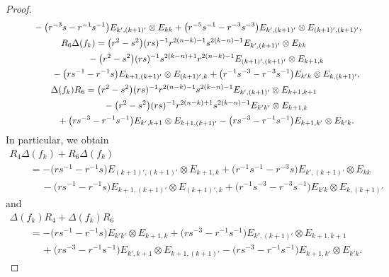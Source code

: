 \documentclass[10pt,a4paper]{amsart}
\numberwithin{equation}{section}
\begin{document}
\begin{proof}
\begin{gather*}
 \quad\qquad{} - \bigl(r^{-3}s - r^{-1}s^{-1} \bigr)E_{k',(k + 1)'} \otimes E_{kk} + \bigl(r^{-5}s^{-1} - r^{-3}s^{-3} \bigr)E_{k',(k + 1)'} \otimes E_{(k + 1)',(k + 1)'},
\\[0.2mm]
 R_{6}\Delta(f_{k}) = \bigl(r^{2} - s^{2} \bigr)(rs)^{-1}r^{2(n - k) - 1}s^{2(k - n) -1}E_{k',(k + 1)'} \otimes E_{kk} \\[0.2mm]
 \hphantom{R_{6}\Delta(f_{k}) =}{}
 - \bigl(r^{2} -s^{2} \bigr)(rs)^{-1}s^{2(k - n) + 1}r^{2(n - k) - 1}E_{(k + 1)',(k + 1)'} \otimes E_{k + 1,k} \\[0.2mm]
 \hphantom{R_{6}\Delta(f_{k}) = }{}
 - \bigl(rs^{-1} - r^{-1}s \bigr)E_{k + 1,(k + 1)'} \otimes E_{(k + 1)',k} + \bigl(r^{-1}s^{-3} - r^{-3}s^{-1} \bigr)E_{k'k} \otimes E_{k,(k + 1)'},
 \\[0.2mm]
 \Delta(f_{k})R_{6} = \bigl(r^{2} - s^{2} \bigr)(rs)^{-1}r^{2(n - k) - 1}s^{2(k - n) - 1}E_{k',(k + 1)'} \otimes E_{k + 1,k + 1} \\[0.2mm]
 \hphantom{\Delta(f_{k})R_{6} =}{}
 - \bigl(r^{2} - s^{2} \bigr)(rs)^{-1}r^{2(n - k) + 1}s^{2(k - n) - 1}E_{k'k'} \otimes E_{k + 1,k} \\[0.2mm]
 \hphantom{\Delta(f_{k})R_{6} =}{}
 + \bigl(rs^{-3} - r^{-1}s^{-1} \bigr)E_{k',k + 1} \otimes E_{k + 1,(k + 1)'} - \bigl(rs^{-3} - r^{-1}s^{-1} \bigr)E_{k + 1,k'} \otimes E_{k'k}.
\end{gather*}
In particular, we obtain
\begin{gather*}
 R_{4}\Delta(f_{k}) + R_{6}\Delta(f_{k}) \\
 \qquad{}= -\bigl(rs^{-1} - r^{-1}s\bigr)E_{(k + 1)',(k + 1)'} \otimes E_{k + 1,k} + \bigl(r^{-1}s^{-1} - r^{-3}s\bigr)E_{k',(k + 1)'} \otimes E_{kk} \\
 \qquad\quad\ {}{-} \bigl(rs^{-1} - r^{-1}s\bigr)E_{k + 1,(k + 1)'} \otimes E_{(k + 1)',k} + \bigl(r^{-1}s^{-3} - r^{-3}s^{-1}\bigr)E_{k'k} \otimes E_{k, (k + 1)'}
\end{gather*}
and
\begin{gather*}
 \Delta(f_{k})R_{4} + \Delta(f_{k})R_{6} \\
 \qquad{}=-\bigl(rs^{-1} - r^{-1}s\bigr)E_{k'k'} \otimes E_{k + 1,k} + \bigl(rs^{-3} - r^{-1}s^{-1}\bigr)E_{k',(k + 1)'} \otimes E_{k + 1,k + 1} \\
 \quad\qquad\ {} {+}\bigl(rs^{-3} - r^{-1}s^{-1}\bigr)E_{k',k + 1} \otimes E_{k + 1,(k + 1)'} - \bigl(rs^{-3} - r^{-1}s^{-1}\bigr)E_{k + 1,k'} \otimes E_{k'k}.
\end{gather*}


\end{proof}
\end{document}

